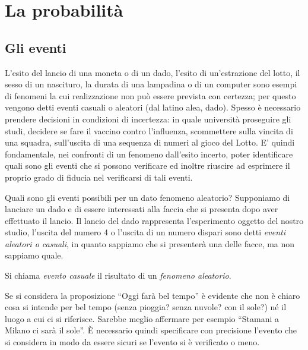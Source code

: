 
\chapter{La probabilità}

\section{Gli eventi}
\label{sec:09_eventi}

L'esito del lancio di una moneta o di un dado, l'esito di un'estrazione del 
lotto, il sesso di un nascituro, la durata di una lampadina o di un computer 
sono esempi di fenomeni la cui realizzazione non può essere prevista con 
certezza; per questo vengono detti eventi casuali o aleatori (dal latino alea, 
dado). Spesso è necessario prendere decisioni in condizioni di incertezza: in 
quale università proseguire gli studi, decidere se fare il vaccino contro 
l'influenza, scommettere sulla vincita di una squadra, sull'uscita di una 
sequenza di numeri al gioco del Lotto. E' quindi fondamentale, nei confronti di 
un fenomeno dall'esito incerto, poter identificare quali sono gli eventi che si 
possono verificare ed inoltre riuscire ad esprimere il proprio grado di fiducia 
nel verificarsi di tali eventi.

Quali sono gli eventi possibili per un dato fenomeno aleatorio? Supponiamo di 
lanciare un dado e di essere interessati alla faccia che si presenta dopo aver 
effettuato il lancio. Il lancio del dado rappresenta l'esperimento oggetto del 
nostro studio, l'uscita del numero 4 o l'uscita di un numero dispari sono detti 
\emph{eventi aleatori o casuali}, in quanto sappiamo che si presenterà una 
delle 
facce, ma non sappiamo quale.

\begin{definizione}
Si chiama \emph{evento casuale} il risultato di un \emph{fenomeno aleatorio}.
\end{definizione}

Se si considera la proposizione ``Oggi farà bel tempo'' è evidente che non è 
chiaro cosa si intende per bel tempo (senza pioggia? senza nuvole? con il 
sole?) 
né il luogo a cui ci si riferisce. Sarebbe meglio affermare per esempio 
``Stamani a Milano ci sarà il sole''. È necessario quindi specificare con 
precisione l'evento che si considera in modo da essere sicuri se l'evento si è 
verificato o meno.

